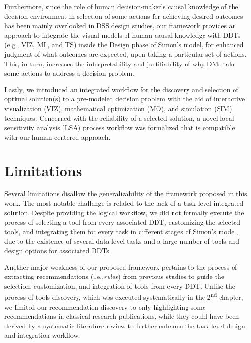 \documentclass{sfuthesis}
\begin{document}
Furthermore, since the role of human decision-maker’s causal knowledge of the decision environment in selection of some actions for achieving desired outcomes has been mainly overlooked in DSS design studies, our framework provides an approach to integrate the visual models of human causal knowledge with DDTs (e.g., VIZ, ML, and TS) inside the Design phase of Simon’s model, for enhanced judgment of what outcomes are expected, upon taking a particular set of actions. This, in turn, increases the interpretability and justifiability of why DMs take some actions to address a decision problem.\par
Lastly, we introduced an integrated workflow for the discovery and selection of optimal solution(s) to a pre-modeled decision problem with the aid of interactive visualization (VIZ), mathematical optimization (MO), and simulation (SIM) techniques. Concerned with the reliability of a selected solution, a novel local sensitivity analysis (LSA) process workflow was formalized that is compatible with our human-centered approach. 
\section{Limitations}
Several limitations disallow the generalizability of the framework proposed in this work. The most notable challenge is related to the lack of a task-level integrated solution. Despite providing the logical workflow, we did not formally execute the process of selecting a tool from every associated DDT, customizing the selected tools, and integrating them for every task in different stages of Simon’s model, due to the existence of several data-level tasks and a large number of tools and design options for associated DDTs.\par
Another major weakness of our proposed framework pertains to the process of extracting recommendations (i.e.,\textit{rules}) from previous studies to guide the selection, customization, and integration of tools from every DDT. Unlike the process of tools discovery, which was executed systematically in the 2\textsuperscript{nd} chapter, we limited our recommendation discovery to only highlighting some recommendations in classical research publications, while they could have been derived by a systematic literature review to further enhance the task-level design and integration workflow.\par
\end{document}
